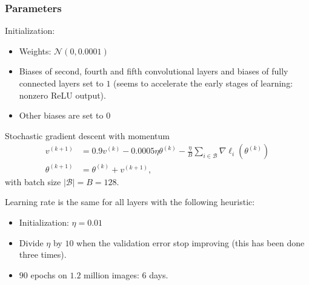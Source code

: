 \begin{frame}
	\frametitle{Parameters}

	Initialization:
	\begin{itemize}
		\item Weights: $\mathcal{N}(0, 0.0001)$
		\item Biases of second, fourth and fifth convolutional layers and biases of fully connected layers set to $1$ (seems to accelerate the early stages of learning: nonzero ReLU output).
		\item Other biases are set to $0$
	\end{itemize}




	\begin{block}{Stochastic gradient descent with momentum}
	\begin{align*}
	v^{(k+1)} & = 0.9 v^{(k)} - 0.0005 \eta \theta^{(k)} - \frac{\eta}{B} \sum_{i \in \mathcal{B}} \nabla \ell_i (\theta^{(k)})\\
	\theta^{(k+1)} & = \theta^{(k)} + v^{(k+1)},
	\end{align*}
	with batch size $|\mathcal{B}| = B = 128$.
	\end{block}



Learning rate is the same for all layers with the following heuristic:
\begin{itemize}
	\item Initialization: $\eta = 0.01$
	\item Divide $\eta$ by $10$ when the validation error stop improving
	(this has been done three times).
	\item $90$ epochs on $1.2$ million images: 6 days.
\end{itemize}


\end{frame}

